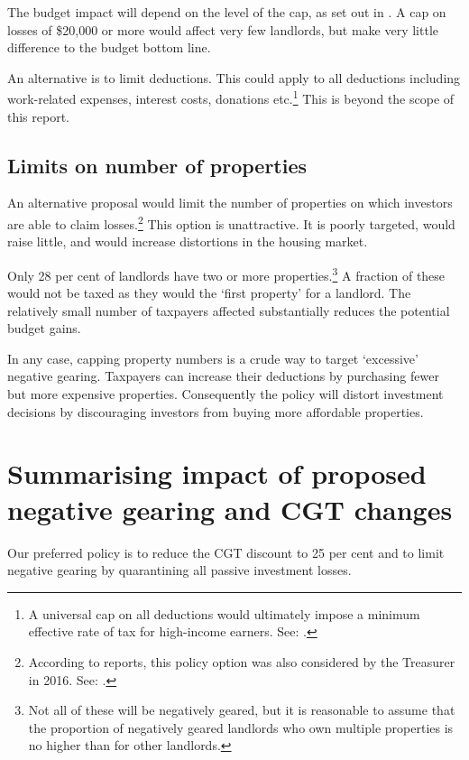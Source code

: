 The budget impact will depend on the level of the cap, as set out in . A cap on losses of \$20,000 or more would affect very few landlords, but make very little difference to the budget bottom line.

An alternative is to limit deductions. This could apply to all deductions including work-related expenses, interest costs, donations etc.\footnote{A universal cap on all deductions would ultimately impose a minimum effective rate of tax for high-income earners. See: \textcite[][61]{BCA2016}.}  This is beyond the scope of this report. 

\subsection{Limits on number of properties}
An alternative proposal would limit the number of properties on which investors are able to claim losses.\footnote{According to reports, this policy option was also considered by the Treasurer in 2016. See: \textcite{Coorey2016}.}  This option is unattractive. It is poorly targeted, would raise little, and would increase distortions in the housing market.

Only 28 per cent of landlords have two or more properties.\footnote{\textcites{ABS2015-Survey-of-income-and-housing-2013-14}{HILDA2015} Not all of these will be negatively geared, but it is reasonable to assume that the proportion of negatively geared landlords who own multiple properties is no higher than for other landlords.} A fraction of these would not be taxed as they would the ‘first property’ for a landlord. The relatively small number of taxpayers affected substantially reduces the potential budget gains. 

In any case, capping property numbers is a crude way to target ‘excessive’ negative gearing. Taxpayers can increase their deductions by purchasing fewer but more expensive properties. Consequently the policy will distort investment decisions by discouraging investors from buying more affordable properties. 

\section{Summarising impact of proposed negative gearing and CGT changes}\label{sec:Summarizing-impact-proposed-NG-and-CGT}
Our preferred policy is to reduce the CGT discount to 25 per cent and to limit negative gearing by quarantining all passive investment losses.


